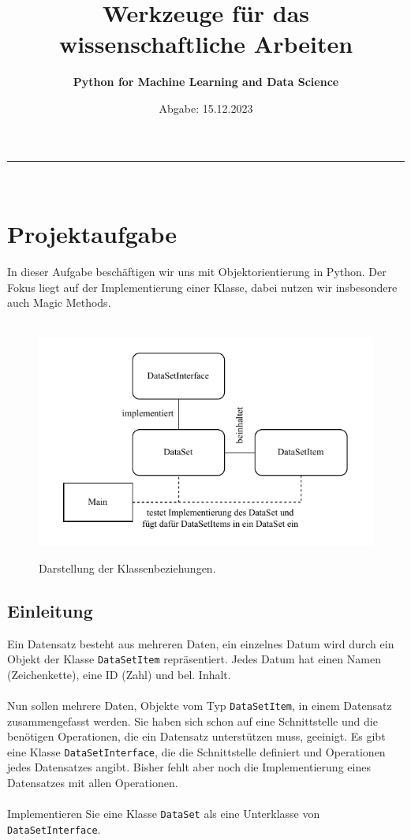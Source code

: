\documentclass[10pt, a4paper, parskip=full]{article}
\begin{document}
\title{\textbf{Werkzeuge für das wissenschaftliche Arbeiten}}
\author{\textbf{Python for Machine Learning and Data Science}}
\date{Abgabe: 15.12.2023}
\maketitle

\hrule\hfill\\[0.2cm]
\tableofcontents


\section{Projektaufgabe}
In dieser Aufgabe beschäftigen wir uns mit Objektorientierung in Python.
Der Fokus liegt auf der Implementierung einer Klasse, dabei nutzen wir insbesondere auch Magic Methods.\\
\\
\begin{figure}[h]
\centering
\includegraphics[width=\textwidth]{./../diagram/classes_files.pdf}\\
\caption{Darstellung der Klassenbeziehungen.} 
\end{figure}

\subsection{Einleitung} 
Ein Datensatz besteht aus mehreren Daten, ein einzelnes Datum wird durch ein Objekt der Klasse \lstinline{DataSetItem} repräsentiert.
Jedes Datum hat einen Namen (Zeichenkette), eine ID (Zahl) und bel. Inhalt.\\
\\
Nun sollen mehrere Daten, Objekte vom Typ \lstinline{DataSetItem}, in einem Datensatz zusammengefasst werden.
Sie haben sich schon auf eine Schnittstelle und die benötigen Operationen, die ein Datensatz unterstützen muss, geeinigt.
Es gibt eine Klasse \lstinline{DataSetInterface}, die die Schnittstelle definiert und Operationen jedes Datensatzes angibt.
Bisher fehlt aber noch die Implementierung eines Datensatzes mit allen Operationen.\\
\\
Implementieren Sie eine Klasse \lstinline{DataSet} als eine Unterklasse von \lstinline{DataSetInterface}.\\
\end{document}
